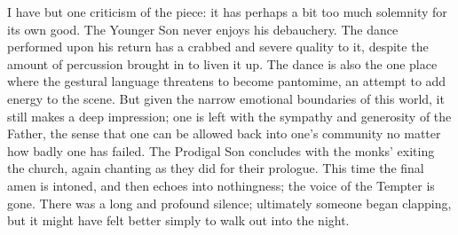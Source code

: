 I have but one criticism of the piece: it has perhaps a bit too much solemnity for its own good. The Younger Son never enjoys his debauchery. The dance performed upon his return has a crabbed and severe quality to it, despite the amount of percussion brought in to liven it up. The dance is also the one place where the gestural language threatens to become pantomime, an attempt to add energy to the scene. But given the narrow emotional boundaries of this world, it still makes a deep impression; one is left with the sympathy and generosity of the Father, the sense that one can be allowed back into one’s community no matter how badly one has failed. The Prodigal Son concludes with the monks’ exiting the church, again chanting as they did for their prologue. This time the final amen is intoned, and then echoes into nothingness; the voice of the Tempter is gone. There was a long and profound silence; ultimately someone began clapping, but it might have felt better simply to walk out into the night.
